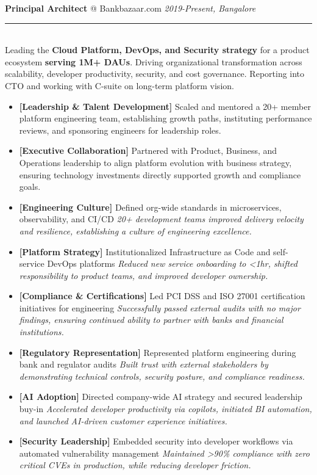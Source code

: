 \documentclass[11pt]{article}
\makeatletter
\newcommand{\roleheader}[3]{%
  {\large\sffamily\textbf{#1} @ #2} \hfill \textit{#3}\\[-0.3em]
  \color{myblue}\rule{\linewidth}{1pt}\\[0.5em]\color{bodytext}
}
\newenvironment{experiencebullets}{%
  \begin{itemize}[leftmargin=1.25em, itemsep=-0.25em]
    \renewcommand{\labelitemi}{\textbullet}
}{%
  \end{itemize}
}
\newenvironment{experience}[4]{%
  \roleheader{#1}{#2}{#3}%
  #4\vspace{0.5em}%
}{%
  \vspace{1em}
}
\newcommand{\expbullet}[3]{%
  \item \textbf{[#1]} {#2} \textrightarrow{} \textit{#3}%
}
\makeatother
\begin{document}
\begin{experience}{Principal Architect}{Bankbazaar.com}{2019-Present, Bangalore}{%
    Leading the \textbf{Cloud Platform, DevOps, and Security strategy} for a product ecosystem \textbf{serving 1M+ DAUs}. Driving organizational transformation across scalability, developer productivity, security, and cost governance. Reporting into CTO and working with C-suite on long-term platform vision.%
  }

  \begin{experiencebullets}
    \item \textbf{[Leadership \& Talent Development]} Scaled and mentored a 20+ member platform engineering team, establishing growth paths, instituting performance reviews, and sponsoring engineers for leadership roles.

    \item \textbf{[Executive Collaboration]} Partnered with Product, Business, and Operations leadership to align platform evolution with business strategy, ensuring technology investments directly supported growth and compliance goals.

    \expbullet{Engineering Culture}{Defined org-wide standards in microservices, observability, and CI/CD}{20+ development teams improved delivery velocity and resilience, establishing a culture of engineering excellence.}

    \expbullet{Platform Strategy}{Institutionalized Infrastructure as Code and self-service DevOps platforms}{Reduced new service onboarding to <1hr, shifted responsibility to product teams, and improved developer ownership.}

    \expbullet{Compliance \& Certifications}{Led PCI DSS and ISO 27001 certification initiatives for engineering}{Successfully passed external audits with no major findings, ensuring continued ability to partner with banks and financial institutions.}

    \expbullet{Regulatory Representation}{Represented platform engineering during bank and regulator audits}{Built trust with external stakeholders by demonstrating technical controls, security posture, and compliance readiness.}

    \expbullet{AI Adoption}{Directed company-wide AI strategy and secured leadership buy-in}{Accelerated developer productivity via copilots, initiated BI automation, and launched AI-driven customer experience initiatives.}

    \expbullet{Security Leadership}{Embedded security into developer workflows via automated vulnerability management}{Maintained >90\% compliance with zero critical CVEs in production, while reducing developer friction.}


\end{experiencebullets}
\end{experience}
\end{document}
